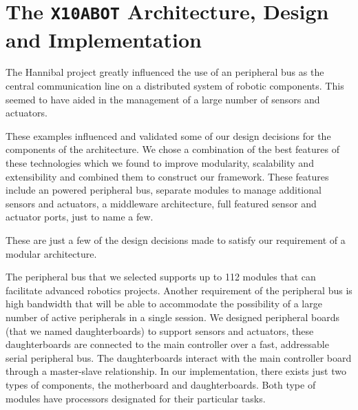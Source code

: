 \chapter{The \texttt{X10ABOT} Architecture, Design and Implementation}%
\label{cha:the_x10abot_architecture_design_and_implementation}








The Hannibal project greatly influenced the use of an \iic peripheral bus as the central communication line on a distributed system of robotic components. This seemed to have aided in the management of a large number of sensors and actuators.

These examples influenced and validated some of our design decisions for the components of the \xten architecture. We chose a combination of the best features of these technologies which we found to improve modularity, scalability and extensibility and combined them to construct our framework. These features include an \iic powered peripheral bus, separate modules to manage additional sensors and actuators, a middleware architecture, full featured sensor and actuator ports, just to name a few.

These are just a few of the design decisions made to satisfy our requirement of a modular architecture. 

The peripheral bus that we selected supports up to 112 modules that can facilitate advanced robotics projects.
Another requirement of the peripheral bus is high bandwidth that will be able to accommodate the possibility of a large number of active peripherals in a single session. We designed peripheral boards (that we named daughterboards) to support sensors and actuators, these daughterboards are connected to the main controller over a fast, addressable serial peripheral bus. The daughterboards interact with the main controller board through a master-slave relationship. In our implementation, there exists just two types of components, the motherboard and daughterboards. Both type of modules have processors designated for their particular tasks.

